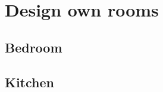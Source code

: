 \chapter{Design own rooms}\label{chp:rooms}
\section{Bedroom}\label{chp:rooms:bedroom}
\section{Kitchen}\label{chp:rooms:kitchen}

